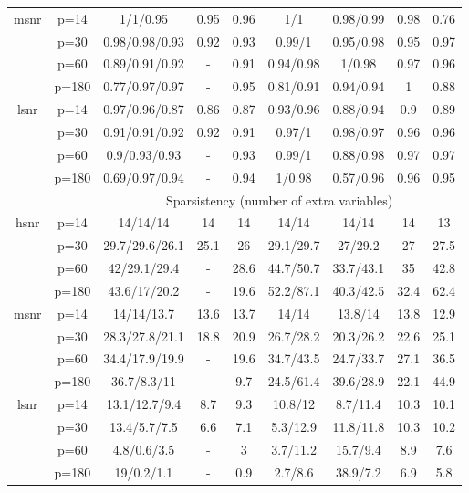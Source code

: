 \begin{table}[ht]
{\begin{tabular}{|c|c|ccccccc|}
  \midrule\multirow{4}[2]{*}{msnr} & p=14 & 1/1/0.95 & 0.95 & 0.96 & 1/1 & 0.98/0.99 & 0.98 & 0.76 \\ 
   & p=30 & 0.98/0.98/0.93 & 0.92 & 0.93 & 0.99/1 & 0.95/0.98 & 0.95 & 0.97 \\ 
   & p=60 & 0.89/0.91/0.92 & - & 0.91 & 0.94/0.98 & 1/0.98 & 0.97 & 0.96 \\ 
   & p=180 & 0.77/0.97/0.97 & - & 0.95 & 0.81/0.91 & 0.94/0.94 & 1 & 0.88 \\ 
  \midrule\multirow{4}[2]{*}{lsnr} & p=14 & 0.97/0.96/0.87 & 0.86 & 0.87 & 0.93/0.96 & 0.88/0.94 & 0.9 & 0.89 \\ 
   & p=30 & 0.91/0.91/0.92 & 0.92 & 0.91 & 0.97/1 & 0.98/0.97 & 0.96 & 0.96 \\ 
   & p=60 & 0.9/0.93/0.93 & - & 0.93 & 0.99/1 & 0.88/0.98 & 0.97 & 0.97 \\ 
   & p=180 & 0.69/0.97/0.94 & - & 0.94 & 1/0.98 & 0.57/0.96 & 0.96 & 0.95 \\ 
   \midrule 
 \multicolumn{1}{|c}{} &       & \multicolumn{7}{c|}{Sparsistency (number of extra variables)} \\
\midrule\multirow{4}[2]{*}{hsnr} & p=14 & 14/14/14 & 14 & 14 & 14/14 & 14/14 & 14 & 13 \\ 
   & p=30 & 29.7/29.6/26.1 & 25.1 & 26 & 29.1/29.7 & 27/29.2 & 27 & 27.5 \\ 
   & p=60 & 42/29.1/29.4 & - & 28.6 & 44.7/50.7 & 33.7/43.1 & 35 & 42.8 \\ 
   & p=180 & 43.6/17/20.2 & - & 19.6 & 52.2/87.1 & 40.3/42.5 & 32.4 & 62.4 \\ 
  \midrule\multirow{4}[2]{*}{msnr} & p=14 & 14/14/13.7 & 13.6 & 13.7 & 14/14 & 13.8/14 & 13.8 & 12.9 \\ 
   & p=30 & 28.3/27.8/21.1 & 18.8 & 20.9 & 26.7/28.2 & 20.3/26.2 & 22.6 & 25.1 \\ 
   & p=60 & 34.4/17.9/19.9 & - & 19.6 & 34.7/43.5 & 24.7/33.7 & 27.1 & 36.5 \\ 
   & p=180 & 36.7/8.3/11 & - & 9.7 & 24.5/61.4 & 39.6/28.9 & 22.1 & 44.9 \\ 
  \midrule\multirow{4}[2]{*}{lsnr} & p=14 & 13.1/12.7/9.4 & 8.7 & 9.3 & 10.8/12 & 8.7/11.4 & 10.3 & 10.1 \\ 
   & p=30 & 13.4/5.7/7.5 & 6.6 & 7.1 & 5.3/12.9 & 11.8/11.8 & 10.3 & 10.2 \\ 
   & p=60 & 4.8/0.6/3.5 & - & 3 & 3.7/11.2 & 15.7/9.4 & 8.9 & 7.6 \\ 
   & p=180 & 19/0.2/1.1 & - & 0.9 & 2.7/8.6 & 38.9/7.2 & 6.9 & 5.8 \\ 
   \bottomrule 
\end{tabular}
}
\end{table}
